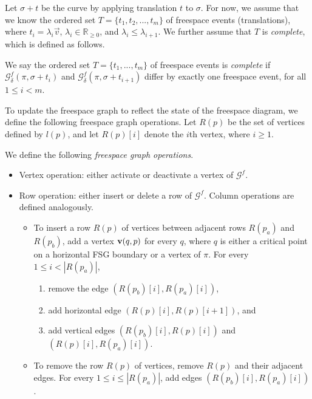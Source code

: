 \documentclass[thm-restate]{lipics-v2021}
\theoremstyle{remark}
\newcommand{\abs}[1]{|#1|}
\newcommand{\graph}[0]{\mathcal{G}}
\newcommand{\reals}[0]{\mathbb{R}}
\newcommand{\vertex}[1]{\normalfont \textbf{v}(#1)}
\newcommand{\fsgraph}[0]{\graph^{f}}
\newcommand{\row}[1]{R(#1)}
\begin{document}
Let $\sigma + t$ be the curve by applying translation $t$ to $\sigma$. For now, we assume that we know the ordered set $T = \{t_1, t_2, ..., t_m\}$ of freespace events (translations), where $t_i = \lambda_i \Vec{v}$, $\lambda_i \in \reals_{\geq 0}$, and $\lambda_i \leq \lambda_{i + 1}$. We further assume that $T$ is \emph{complete}, which is defined as follows. 
\begin{definition} \label{def:complete-event}
    We say the ordered set $T = \{t_1, ..., t_m\}$ of freespace events is \emph{complete} if $\fsgraph_\delta(\pi, \sigma + t_i)$ and $\fsgraph_\delta(\pi, \sigma + t_{i + 1})$ differ by exactly one freespace event, for all $1 \leq i < m$. 
\end{definition}

To update the freespace graph to reflect the state of the freespace diagram, we define the following freespace graph operations. Let $\row{p}$ be the set of vertices defined by $l(p)$, and let $\row{p}[i]$ denote the $i$th vertex, where $i \geq 1$. 
\begin{definition} \label{def:fsg-operations}
    We define the following \emph{freespace graph operations}. 
    \begin{itemize}
        \item Vertex operation: either activate or deactivate a vertex of $\fsgraph$. 
        \item Row operation: either insert or delete a row of $\fsgraph$. Column operations are defined analogously. 
        \begin{itemize}
            \item To insert a row $\row{p}$ of vertices between adjacent rows $\row{p_a}$ and $\row{p_b}$, add a vertex $\vertex{q, p}$ for every $q$, where $q$ is either a critical point on a horizontal FSG boundary or a vertex of $\pi$. For every $1 \leq i < \abs{\row{p_a}}$, 
            \begin{enumerate}
                \item remove the edge $(\row{p_b}[i], \row{p_a}[i])$, 
                \item add horizontal edge $(\row{p}[i], \row{p}[i + 1])$, and
                \item add vertical edges $(\row{p_b}[i], \row{p}[i])$ and $(\row{p}[i], \row{p_a}[i])$. 
            \end{enumerate}
            \item To remove the row $\row{p}$ of vertices, remove $\row{p}$ and their adjacent edges. For every $1 \leq i \leq \abs{\row{p_a}}$, add edges $(\row{p_b}[i], \row{p_a}[i])$.
        \end{itemize}
    \end{itemize}
\end{definition}
\end{document}
